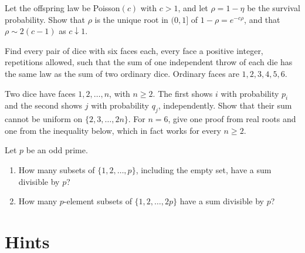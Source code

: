 \begin{exercise}[$\star\star\star$]\label{ex:poissongw}
Let the offspring law be Poisson$(c)$ with $c>1$, and let $\rho=1-\eta$ be the survival probability. Show that $\rho$ is the unique root in $(0,1]$ of $1-\rho=e^{-c\rho}$, and that $\rho\sim 2(c-1)$ as $c\downarrow1$.
\end{exercise}


\begin{exercise}[$\star\star$]\label{pb:sicherman}
Find every pair of dice with six faces each, every face a positive integer, repetitions allowed, such that the sum of one independent throw of each die has the same law as the sum of two ordinary dice. Ordinary faces are $1,2,3,4,5,6$.
\end{exercise}

\begin{exercise}[$\star\star$]\label{pb:loaded}
Two dice have faces $1,2,\ldots,n$, with $n\ge2$. The first shows $i$ with probability $p_i$ and the second shows $j$ with probability $q_j$, independently. Show that their sum cannot be uniform on $\{2,3,\ldots,2n\}$. For $n=6$, give one proof from real roots and one from the inequality below, which in fact works for every $n\ge2$.
\end{exercise}

\begin{exercise}[$\star\star$]\label{pb:subsetsum}
Let $p$ be an odd prime.
\begin{enumerate}[label=(\alph*)]
\item How many subsets of $\{1,2,\ldots,p\}$, including the empty set, have a sum divisible by $p$?
\item How many $p$-element subsets of $\{1,2,\ldots,2p\}$ have a sum divisible by $p$?
\end{enumerate}
\end{exercise}

\section{Hints}


